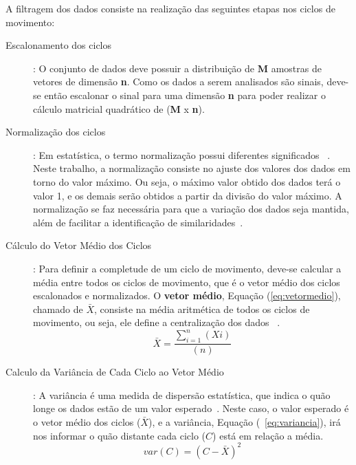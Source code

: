A filtragem dos dados consiste na realização das seguintes etapas nos ciclos de movimento:
\begin{description}
	\item [Escalonamento dos ciclos]: O conjunto de dados deve possuir a distribuição de \textbf{M} amostras de vetores de dimensão \textbf{n}. Como os dados a serem analisados são sinais, deve-se então escalonar o sinal para uma dimensão \textbf{n} para poder realizar o cálculo matricial quadrático de (\textbf{M} x \textbf{n}).		
	\item [Normalização dos ciclos]: Em estatística, o termo normalização possui diferentes significados ~\cite{statisticterms2006}. Neste trabalho, a normalização consiste no ajuste dos valores dos dados em torno do valor máximo. Ou seja, o máximo valor obtido dos dados terá o valor 1, e os demais serão obtidos a partir da divisão do valor máximo. A normalização se faz necessária para que a variação dos dados seja mantida, além de facilitar a identificação de similaridades~\cite{vicini2005}. 	
	\item [Cálculo do Vetor Médio dos Ciclos]: Para definir a completude de um ciclo de movimento, deve-se calcular a média entre todos os ciclos de movimento, que é o vetor médio dos ciclos escalonados e normalizados. O \textbf{vetor médio}, Equação (\ref{eq:vetormedio}), chamado de $\bar{X}$, consiste na média aritmética de todos os ciclos de movimento, ou seja, ele define a centralização dos dados ~\cite{statisticshandbook2009}. 	
		\begin{equation}
			\bar{X}=\frac{\sum_{i=1}^{n}(Xi)}{(n)}
			\label{eq:vetormedio}
		\end{equation}
	\item [Calculo da Variância de Cada Ciclo ao Vetor Médio]: A variância é uma medida de dispersão estatística, que indica o quão longe os dados estão de um valor esperado~\cite{statisticshandbook2009}. Neste caso, o valor esperado é o vetor médio dos ciclos ($\bar{X}$), e a variância, Equação (~\ref{eq:variancia}), irá nos informar o quão distante cada ciclo ($C$) está em relação a média.
		\begin{equation}
			var(C) = (C - \bar{X} )^2
			\label{eq:variancia}
		\end{equation}
		

\end{description}
